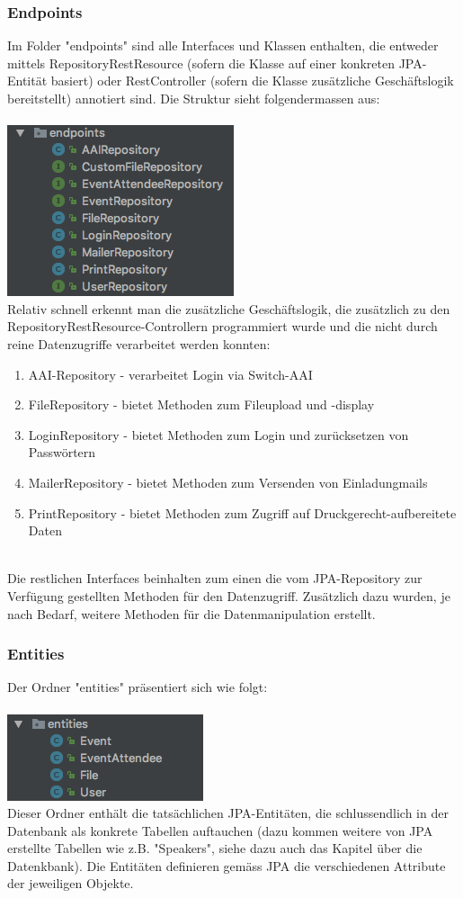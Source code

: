 \documentclass[11pt]{article} %
\begin{document}
\subsubsection{Endpoints}
Im Folder "endpoints" sind alle Interfaces und Klassen enthalten, die entweder mittels RepositoryRestResource (sofern die Klasse auf einer konkreten JPA-Entität basiert) oder RestController (sofern die Klasse zusätzliche Geschäftslogik bereitstellt) annotiert sind. Die Struktur sieht folgendermassen aus:
\\
\\
\includegraphics[scale=0.7]{structure_eventmanagement_endpoints}
\\
Relativ schnell erkennt man die zusätzliche Geschäftslogik, die zusätzlich zu den RepositoryRestResource-Controllern programmiert wurde und die nicht durch reine Datenzugriffe verarbeitet werden konnten:
\begin{enumerate}
\item AAI-Repository - verarbeitet Login via Switch-AAI
\item FileRepository - bietet Methoden zum Fileupload und -display
\item LoginRepository - bietet Methoden zum Login und zurücksetzen von Passwörtern
\item MailerRepository - bietet Methoden zum Versenden von Einladungmails
\item PrintRepository - bietet Methoden zum Zugriff auf Druckgerecht-aufbereitete Daten
\end{enumerate}
\\
Die restlichen Interfaces beinhalten zum einen die vom JPA-Repository zur Verfügung gestellten Methoden für den Datenzugriff. Zusätzlich dazu wurden, je nach Bedarf, weitere Methoden für die Datenmanipulation erstellt.
\subsubsection{Entities}
Der Ordner "entities" präsentiert sich wie folgt:
\\
\\
\includegraphics[scale=0.7]{structure_eventmanagement_entities}
\\
Dieser Ordner enthält die tatsächlichen JPA-Entitäten, die schlussendlich in der Datenbank als konkrete Tabellen auftauchen (dazu kommen weitere von JPA erstellte Tabellen wie z.B. "Speakers", siehe dazu auch das Kapitel über die Datenkbank). Die Entitäten definieren gemäss JPA die verschiedenen Attribute der jeweiligen Objekte.
\end{document}
